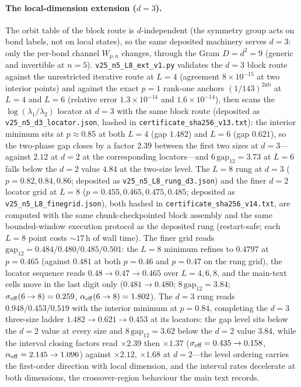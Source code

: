 \documentclass[aps,prx,reprint,superscriptaddress,nobibnotes,longbibliography]{revtex4-2}
\begin{document}
\paragraph{The local-dimension extension ($d=3$).}
The orbit table of the block route is $d$-independent (the symmetry
group acts on bond labels, not on local states), so the same deposited
machinery serves $d=3$: only the per-bond channel $W_{p,n}$ changes,
through the Gram $D=d^2=9$ (generic and invertible at $n=5$).
\texttt{v25\_n5\_L8\_ext\_v1.py} validates the $d=3$ block route
against the unrestricted iterative route at $L=4$ (agreement
$8\times10^{-15}$ at two interior points) and against the exact $p=1$
rank-one anchors $(1/143)^{2\mathrm{nb}}$ at $L=4$ and $L=6$ (relative
error $1.3\times10^{-14}$ and $1.6\times10^{-14}$), then scans the
$\log(\lambda_1/\lambda_2)$ locator at $d=3$ with the same block route
(deposited as \texttt{v25\_n5\_d3\_locator.json}, hashed in
\texttt{certificate\_sha256\_v13.txt}): the interior minimum sits at
$p\approx0.85$ at both $L=4$ (gap $1.482$) and $L=6$ (gap $0.621$), so
the two-phase gap closes by a factor $2.39$ between the first two sizes
at $d=3$---against $2.12$ at $d=2$ at the corresponding locators---and
$6\,\mathrm{gap}_{12}=3.73$ at $L=6$ falls below the $d=2$ value
$4.84$ at the two-size level.  The $L=8$ rung at $d=3$ ($p=0.82,0.84,0.86$;
deposited as \texttt{v25\_n5\_L8\_rung\_d3.json}) and the finer $d=2$
locator grid at $L=8$ ($p=0.455,0.465,0.475,0.485$; deposited as
\texttt{v25\_n5\_L8\_finegrid.json}), both hashed in
\texttt{certificate\_sha256\_v14.txt}, are computed with the same
chunk-checkpointed block assembly and the same bounded-window execution
protocol as the deposited rung (restart-safe; each $L=8$
point costs ${\sim}17$\,h of wall time).  The finer grid reads
$\mathrm{gap}_{12}=0.484/0.480/0.485/0.501$: the $L=8$ minimum refines
to $0.4797$ at $p=0.465$ (against $0.481$ at both $p=0.46$ and $p=0.47$
on the rung grid), the locator sequence reads $0.48\to0.47\to0.465$
over $L=4,6,8$, and the main-text cells move in the last digit only
($0.481\to0.480$; $8\,\mathrm{gap}_{12}=3.84$; $\sigma_{\rm eff}(6\to8)=0.259$,
$\alpha_{\rm eff}(6\to8)=1.802$).  The $d=3$ rung reads $0.948/0.453/0.519$
with the interior minimum at $p=0.84$, completing the $d=3$ three-size ladder
$1.482\to0.621\to0.453$ at its locators: the gap level sits below the
$d=2$ value at every size and $8\,\mathrm{gap}_{12}=3.62$ below the
$d=2$ value $3.84$, while the interval closing factors read $\times2.39$
then $\times1.37$ ($\sigma_{\rm eff}=0.435\to0.158$,
$\alpha_{\rm eff}=2.145\to1.096$) against $\times2.12$, $\times1.68$ at
$d=2$---the level ordering carries the first-order direction with local
dimension, and the interval rates decelerate at both dimensions, the
crossover-region behaviour the main text records.
\end{document}

